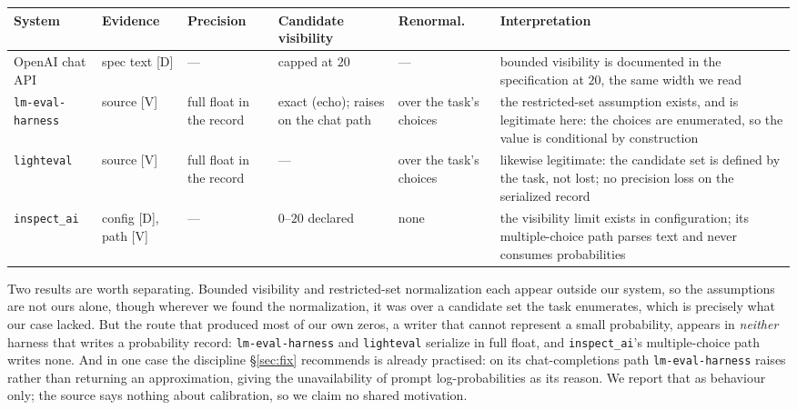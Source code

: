 \documentclass{article}
\newif\ifclaimtags\claimtagsfalse
\newcommand{\ct}[1]{\ifclaimtags\hfill{\scriptsize\textcolor{gray}{[#1]}}\fi}
\begin{document}
\label{tab:audit}
\begin{center}\footnotesize
\setlength{\tabcolsep}{4pt}
\begin{tabular}{@{}>{\raggedright\arraybackslash}p{2.1cm}>{\raggedright\arraybackslash}p{1.5cm}>{\raggedright\arraybackslash}p{1.9cm}>{\raggedright\arraybackslash}p{2.0cm}>{\raggedright\arraybackslash}p{1.7cm}>{\raggedright\arraybackslash}p{3.0cm}@{}}
\toprule
System & Evidence & Precision & Candidate visibility & Renormal.\ & Interpretation \\
\midrule
OpenAI chat API & spec text [D] & --- & capped at $20$ & --- & bounded visibility is documented in the specification at $20$, the same width we read \\[2pt]
\texttt{lm-eval-\allowbreak{}harness} & source [V] & full float in the record & exact (echo); raises on the chat path & over the task's choices & the restricted-set assumption exists, and is legitimate here: the choices are enumerated, so the value is conditional by construction \\[2pt]
\texttt{lighteval} & source [V] & full float in the record & --- & over the task's choices & likewise legitimate: the candidate set is defined by the task, not lost; no precision loss on the serialized record \\[2pt]
\texttt{inspect\_ai} & config [D], path [V] & --- & $0$--$20$ declared & none & the visibility limit exists in configuration; its multiple-choice path parses text and never consumes probabilities \\
\bottomrule
\end{tabular}
\end{center}

\noindent Two results are worth separating. Bounded visibility and restricted-set
normalization each appear outside our system, so the assumptions are not ours alone, though wherever we found the normalization, it was over a candidate set the
task enumerates, which is precisely what our case lacked. But the route that produced most of
our own zeros, a writer that cannot represent a small probability, appears in
\emph{neither} harness that writes a probability record: \texttt{lm-eval-\allowbreak{}harness}
and \texttt{lighteval} serialize in full float, and \texttt{inspect\_ai}'s
multiple-choice path writes none. And in one case the discipline
\S\ref{sec:fix} recommends is already practised: on its chat-completions path
\texttt{lm-eval-harness} raises rather than returning an approximation, giving the
unavailability of prompt log-probabilities as its reason. We report that as behaviour
only; the source says nothing about calibration, so we claim no shared
motivation.\ct{C85, C86, C87, C88, C89, C90}


\end{document}
